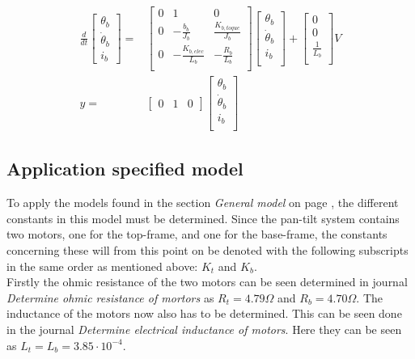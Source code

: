 \documentclass[../../main]{subfiles}
\begin{document}
\begin{equation}
      \label{eq:ss_buttomframe}
      \begin{split}
      \frac{d}{dt}
    \begin{bmatrix}
        \theta_b \\
        \dot \theta_b \\
        i_b
    \end{bmatrix}
    =&
    \begin{bmatrix}
        0 & 1               & 0             \\
        0 & -\frac{b_b}{J_b}    & \frac{K_{b,toque}}{J_b} \\
        0 & -\frac{K_{b,elec}}{L_b}  & -\frac{R_b}{L_b}  \\
    \end{bmatrix}
    \begin{bmatrix}
        \theta_b \\
        \dot \theta_b \\
        i_b \\
    \end{bmatrix}
    +
    \begin{bmatrix}
        0 \\
        0 \\
        \frac{1}{L_b} \\
    \end{bmatrix}
    V
\\
      y =&
    \begin{bmatrix}
        0 & 1 & 0
    \end{bmatrix}
    \begin{bmatrix}
        \theta_b \\
        \dot \theta_b\\
        i_b\\
    \end{bmatrix}
  \end{split}
\end{equation}


\subsection{Application specified model}

To apply the models found in the section \textit{General model} on page \pageref{sec:General_model}, the different constants in this model must be determined. Since the pan-tilt system contains two motors, one for the top-frame, and one for the base-frame, the constants concerning these will from this point on be denoted with the following subscripts in the same order as mentioned above: $K_t$ and $K_{b}$.\\
Firstly the ohmic resistance of the two motors can be seen determined in journal \textit{Determine ohmic resistance of mortors} as $R_t = 4.79 \Omega$ and $R_b = 4.70 \Omega$. The inductance of the motors now also has to be determined. This can be seen done in the journal \textit{Determine electrical inductance of motors}. Here they can be seen as $L_t = L_b = 3.85\cdot 10^{-4}$.\\
\end{document}
